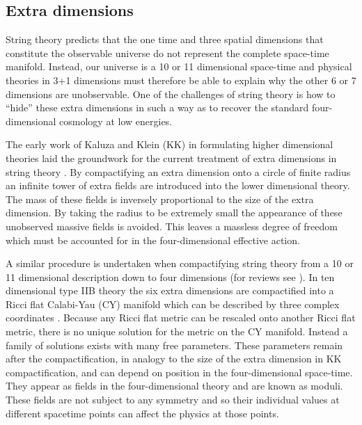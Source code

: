\subsection{Extra dimensions}
String theory predicts that the one time and three spatial dimensions that
constitute the observable universe do not represent the complete space-time manifold.
Instead,
our universe is a 10 or
11 dimensional space-time and physical theories in 3+1 dimensions must
therefore be able to explain why the 
other 6 or 7 dimensions are unobservable. One of the challenges of string
theory is how 
to ``hide'' these extra dimensions in such a way as to 
recover the standard four-dimensional cosmology at low energies.

The early work of Kaluza and Klein (KK) in formulating higher dimensional 
theories laid the groundwork for the current treatment of extra dimensions in
string theory \cite{Kaluza1921, Klein1926}. By
compactifying an extra dimension onto a circle of finite radius an infinite
tower of extra fields are introduced into the lower dimensional theory. The
mass of these fields is inversely proportional to the size of the extra
dimension. By taking the radius to be extremely small the appearance of these
unobserved massive fields is avoided. This leaves a
massless degree of freedom which must be accounted for in the four-dimensional
effective action. 


A similar procedure is undertaken when compactifying string theory from a
10 or 11 dimensional description down to four dimensions (for reviews see
\cite{douglas,grana}).
In ten dimensional type IIB theory the six extra dimensions are
compactified into a Ricci flat Calabi-Yau (CY) manifold which can be described
by three complex coordinates \cite{Yau1977}. 
Because any Ricci flat metric can be
rescaled onto another Ricci flat metric, there is no unique solution for the
metric on the CY manifold. Instead a family of solutions exists with many free
parameters. These parameters remain after the compactification, in
analogy to the size of the extra dimension in KK compactification, and can depend
on position in the four-dimensional space-time. They appear as fields
in the four-dimensional theory and are known as moduli. 
These fields are not subject to any symmetry and so their individual values
at different spacetime points can affect the physics at those points.






